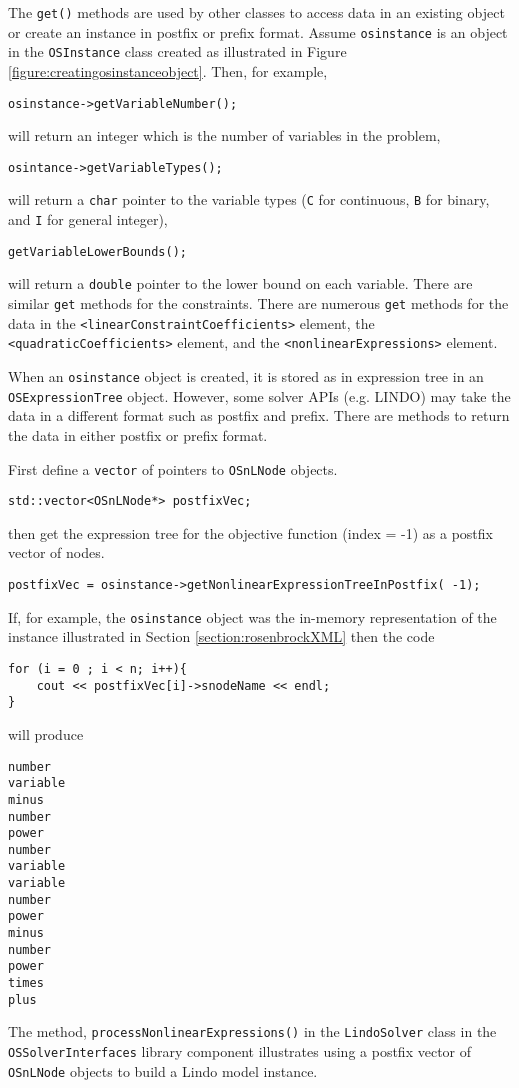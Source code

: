 \documentclass[11pt]{article}
\newcounter{Fig}
\renewcommand{\_}{{\char"5F}}
\renewcommand{\{}{{\char"7B}}
\renewcommand{\}}{{\char"7D}}
\renewcommand{\^}{{\char"0D}}
\renewcommand{\'}{{\char"0D}}
\begin{document}
The {\tt get()} methods are used by other classes to access data in an existing object or create an instance in postfix or prefix format.   Assume {\tt osinstance} is an object in the {\tt OSInstance} class created as illustrated in Figure \ref{figure:creatingosinstanceobject}. Then, for example, 
\begin{verbatim}
osinstance->getVariableNumber();
\end{verbatim}
will return an integer which is the number of variables in the problem, 
\begin{verbatim}
osintance->getVariableTypes();
\end{verbatim}
will return a {\tt char} pointer to the variable types ({\tt C} for continuous, {\tt B} for binary, and {\tt I} for general integer),
\begin{verbatim}
getVariableLowerBounds();
\end{verbatim}
will  return a {\tt double} pointer to the lower bound on each variable. There are similar {\tt get} methods for the constraints. There are numerous {\tt get} methods for the data in the {\tt <linearConstraintCoefficients>}  element, the {\tt <quadraticCoefficients>} element, and the {\tt <nonlinearExpressions>} element. 

When an {\tt osinstance} object is created, it is stored as in expression tree in an {\tt OSExpressionTree} object. However, some solver APIs (e.g. LINDO) may take the data in a different format such as postfix and prefix. There are methods to return the data in either postfix or prefix format. 

First define a {\tt vector} of pointers to {\tt OSnLNode} objects.
\begin{verbatim}
std::vector<OSnLNode*> postfixVec;
\end{verbatim}
then get the expression tree for the objective function (index = -1) as a postfix vector of nodes. 
\begin{verbatim}
postfixVec = osinstance->getNonlinearExpressionTreeInPostfix( -1);
\end{verbatim}
If, for example, the {\tt osinstance} object was the in-memory representation of   the instance illustrated in  Section \ref{section:rosenbrockXML} then the code
\begin{verbatim}
for (i = 0 ; i < n; i++){
	cout << postfixVec[i]->snodeName << endl;	
}
\end{verbatim}
will produce
\begin{verbatim}
number
variable
minus
number
power
number
variable
variable
number
power
minus
number
power
times
plus
\end{verbatim}
The method, {\tt processNonlinearExpressions()} in the {\tt LindoSolver} class in the {\tt OSSolverInterfaces} library component illustrates using a postfix vector of {\tt OSnLNode} objects to build a Lindo model instance.
\end{document}
